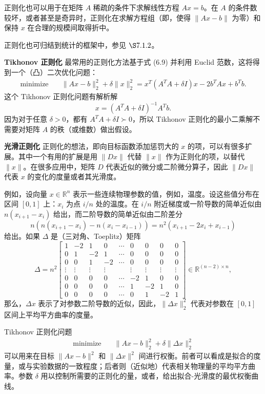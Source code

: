 \documentclass[UTF8,12pt,a4paper,fontset=fandol]{ctexart}
\begin{document}
正则化也可以用于在矩阵 $A$ 稀疏的条件下求解线性方程 $Ax=b$。在 $A$ 的条件数较坏，或者甚至是奇异时，正则化在求解方程组（即，使得 $\|Ax-b\|$ 为零）和保持 $x$ 在合理的规模间取得折中。

正则化也可归结到统计的框架中，参见 $\S 7.1.2$。

\noindent\textbf{Tikhonov 正则化}\quad
最常用的正则化方法基于式 (6.9) 并利用 Euclid 范数，这将得到一个（凸）二次优化问题：
\begin{equation}
\begin{aligned}
\text{minimize}\quad & \|Ax-b\|_2^2+\delta\|x\|_2^2
=x^T(A^TA+\delta I)x-2b^TAx+b^Tb.
\end{aligned}
\tag{6.10}
\end{equation}
这个 Tikhonov 正则化问题有解析解
\[
x=(A^TA+\delta I)^{-1}A^Tb.
\]
因为对于任意 $\delta>0$，都有 $A^TA+\delta I\succ 0$，所以 Tikhonov 正则化的最小二乘解不需要对矩阵 $A$ 的秩（或维数）做出假设。

\noindent\textbf{光滑正则化}\quad
正则化的想法，即向目标函数添加惩罚大的 $x$ 的项，可以有很多扩展。其中一个有用的扩展是用 $\|Dx\|$ 代替 $\|x\|$ 作为正则化的项，以替代 $\|x\|$。在很多应用中，矩阵 $D$ 代表近似的微分或二阶微分算子，因此 $\|Dx\|$ 代表 $x$ 的变化的度量或者其光滑度。

例如，设向量 $x\in\mathbb{R}^n$ 表示一些连续物理参数的值，例如，温度。设这些值分布在区间 $[0,1]$ 上：$x_i$ 为点 $i/n$ 处的温度。在 $i/n$ 附近梯度或一阶导数的简单近似由 $n(x_{i+1}-x_i)$ 给出，而二阶导数的简单近似由二阶差分
\[
n\left(n(x_{i+1}-x_i)-n(x_i-x_{i-1})\right)=n^2(x_{i+1}-2x_i+x_{i-1})
\]
给出。如果 $\Delta$ 是（三对角、Toeplitz）矩阵
\[
\Delta=n^2
\begin{bmatrix}
1 & -2 & 1 & 0 & \cdots & 0 & 0 & 0 & 0\\
0 & 1 & -2 & 1 & \cdots & 0 & 0 & 0 & 0\\
0 & 0 & 1 & -2 & \cdots & 0 & 0 & 0 & 0\\
\vdots & \vdots & \vdots & \vdots & & \vdots & \vdots & \vdots & \vdots\\
0 & 0 & 0 & 0 & \cdots & -2 & 1 & 0 & 0\\
0 & 0 & 0 & 0 & \cdots & 1 & -2 & 1 & 0\\
0 & 0 & 0 & 0 & \cdots & 0 & 1 & -2 & 1
\end{bmatrix}
\in\mathbb{R}^{(n-2)\times n},
\]
那么，$\Delta x$ 表示了对参数二阶导数的近似，因此，$\|\Delta x\|_2^2$ 代表对参数在 $[0,1]$ 区间上平均平方曲率的度量。

Tikhonov 正则化问题
\[
\begin{aligned}
\text{minimize}\quad & \|Ax-b\|_2^2+\delta\|\Delta x\|_2^2
\end{aligned}
\]
可以用来在目标 $\|Ax-b\|^2$ 和 $\|\Delta x\|^2$ 间进行权衡。前者可以看成是拟合的度量，或与实验数据的一致程度；后者则（近似地）代表相关物理量的平均平方曲率。参数 $\delta$ 用以控制所需要的正则化的量，或者，给出拟合-光滑度的最优权衡曲线。
\end{document}
